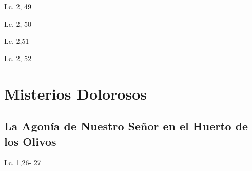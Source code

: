 \documentclass[a4paper,11pt,sans]{article}
\begin{document}
      \begin{multicols}{2}

      \columnbreak
          
      \end{multicols}
      \begin{center}
        Lc. 2, 49        
      \end{center}
      
      \begin{multicols}{2}

      \columnbreak
          
      \end{multicols}
      \begin{center}
        Lc. 2, 50        
      \end{center}
      
      \begin{multicols}{2}

      \columnbreak
          
      \end{multicols}
      \begin{center}
        Lc. 2,51       
      \end{center}      
      
      \begin{multicols}{2}

      \columnbreak
          
      \end{multicols}
      \begin{center}
        Lc. 2, 52        
      \end{center}
            
    \newpage
        
  \section*{\hfil Misterios Dolorosos \hfil}
    \subsection*{\hfil La Agonía de Nuestro Señor en el Huerto de los Olivos \hfil}
      \begin{multicols}{2}

      \columnbreak
           
      \end{multicols}
      \begin{center}
        Lc. 1,26- 27           
      \end{center}
\end{document}
